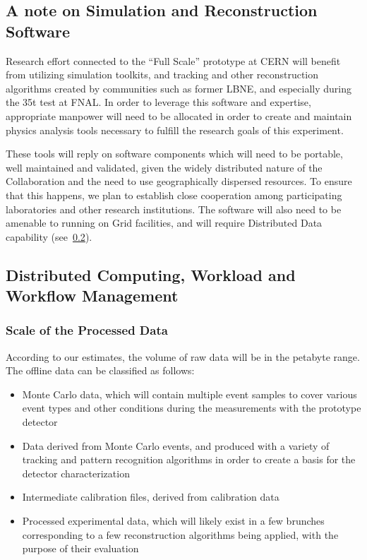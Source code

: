 
\subsection{A note on Simulation and Reconstruction Software}
Research effort connected to the ``Full Scale'' prototype at CERN will benefit from utilizing simulation toolkits, and tracking and other reconstruction
algorithms created by communities such as former LBNE, and especially during the 35t test at FNAL. In order to leverage this
software and expertise, appropriate manpower will need to be allocated in order to create and maintain physics analysis tools
necessary to fulfill the research goals of this experiment.

These tools will reply on software components which will need to be portable, well maintained and validated, given
the widely distributed nature of the Collaboration and the need to use geographically dispersed resources. To ensure that this happens,
we plan to establish close cooperation among participating laboratories and other research institutions. The software will also need
to be amenable to running on Grid facilities, and will require Distributed Data capability (see~\ref{wms}).

\subsection{Distributed Computing, Workload and Workflow Management}
\label{wms}
\subsubsection{Scale of the Processed Data}
According to our estimates, the volume of raw data will be in the petabyte range. The offline data can be classified as follows:
\begin{itemize}
\item Monte Carlo data, which will contain multiple event samples to cover various event types and other conditions during the measurements with the prototype detector
\item Data derived from Monte Carlo events, and produced with a variety of tracking and pattern recognition algorithms in order to create a basis for the detector characterization
\item Intermediate calibration files, derived from calibration data
\item Processed experimental data, which will likely exist in a few brunches corresponding to a few reconstruction algorithms being applied, with the purpose of their evaluation
\end{itemize}

